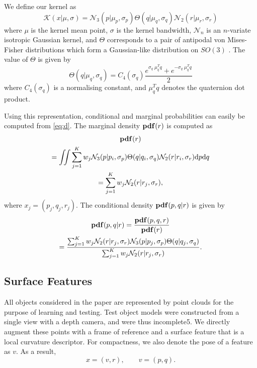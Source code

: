 We define our kernel as
\begin{equation}\label{eq:kernel_in_se3}
\mathcal{K}(x| \mu, \sigma) = \mathcal{N}_3(p| \mu_p, \sigma_p) \Theta(q| \mu_q, \sigma_q) \mathcal{N}_2(r| \mu_r, \sigma_r)
\end{equation}
where $\mu$ is the kernel mean point, $\sigma$ is the kernel bandwidth, $\mathcal{N}_n$ is an $n$-variate isotropic Gaussian kernel, and ${\Theta}$ corresponds to a pair of antipodal von Mises-Fisher distributions which form a Gaussian-like distribution on $SO(3)$ \cite{fisher1953a,sudderth2006a}. The value of ${\Theta}$ is given by
\begin{equation}
\Theta(q|\mu_q, \sigma_q) = C_4(\sigma_q) \frac {e^{\sigma_q \; \mu_q^T q} + e^{-\sigma_q \; \mu_q^T q}}2
\end{equation}
where $C_4(\sigma_q)$ is a normalising constant, and $\mu_q^T q$ denotes the quaternion dot product.

Using this representation, conditional and marginal probabilities can easily be computed from \eq\eqref{eq:d}. The marginal density $\mathbf{pdf}(r)$ is computed as
\begin{multline}\label{eq:marginal}
\mathbf{pdf}(r)\\
= \iint \sum_{j=1}^K w_j \mathcal{N}_3(p| p_i, \sigma_p) \Theta(q| q_i, \sigma_q) \mathcal{N}_2(r| r_i, \sigma_r) \textnormal{d}p\textnormal{d}q \\
=  \sum_{j=1}^K w_j \mathcal{N}_2(r| r_j, \sigma_r),
\end{multline}
where $x_j = (p_j, q_j, r_j)$.
The  conditional density $\mathbf{pdf}(p,q|r)$ is given by
\begin{multline}\label{eq:conditional}
\mathbf{pdf}(p,q|{r}) = \frac{\mathbf{pdf}(p, q, {r})}{\mathbf{pdf}({r})}\\
= \frac{\sum_{j=1}^K w_j \mathcal{N}_2({r}| r_j, \sigma_r) \mathcal{N}_3(p| p_j, \sigma_p) \Theta(q|q_j, \sigma_q)}{\sum_{j=1}^K w_j \mathcal{N}_2({r}| r_j, \sigma_r)}. 
\end{multline}

\subsection{Surface Features}
\label{sec:surface_features}

All objects considered in the paper are represented by point clouds for the purpose of learning and testing. Test object models were constructed from a single view with a depth camera, and were thus incomplete5. We directly augment these points with a frame of reference and a surface feature that is a local curvature descriptor. For compactness, we also denote the pose of a feature as $v$. As a result,
\begin{equation}
x = (v, r), \qquad v = (p, q).
\label{eq:surface.feature}
\end{equation}

